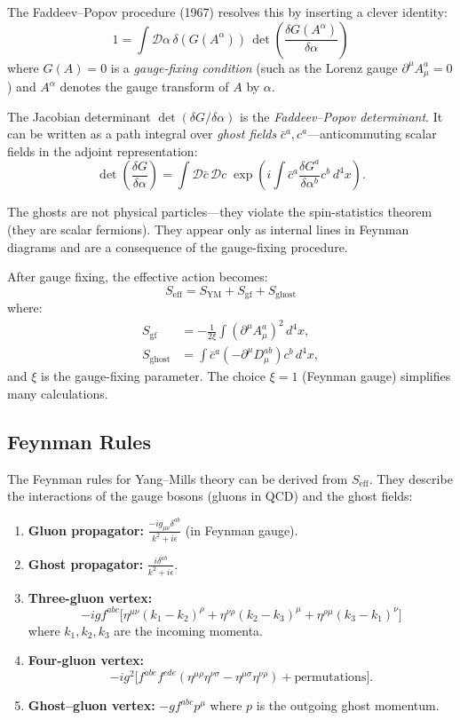 The Faddeev--Popov procedure (1967) resolves this by inserting a clever identity:
\[
1 = \int \mathcal{D}\alpha \, \delta(G(A^\alpha)) \, \det\left(\frac{\delta G(A^\alpha)}{\delta \alpha}\right)
\]
where $G(A) = 0$ is a \textit{gauge-fixing condition} (such as the Lorenz gauge $\partial^\mu A_\mu^a = 0$) and $A^\alpha$ denotes the gauge transform of $A$ by $\alpha$.

The Jacobian determinant $\det(\delta G/\delta \alpha)$ is the \textit{Faddeev--Popov determinant}. It can be written as a path integral over \textit{ghost fields} $\bar{c}^a, c^a$---anticommuting scalar fields in the adjoint representation:
\[
\det\left(\frac{\delta G}{\delta \alpha}\right) = \int \mathcal{D}\bar{c}\,\mathcal{D}c \; \exp\left(i\int \bar{c}^a \frac{\delta G^a}{\delta \alpha^b} c^b \, d^4x\right).
\]

The ghosts are not physical particles---they violate the spin-statistics theorem (they are scalar fermions). They appear only as internal lines in Feynman diagrams and are a consequence of the gauge-fixing procedure.

After gauge fixing, the effective action becomes:
\[
S_{\mathrm{eff}} = S_{\mathrm{YM}} + S_{\mathrm{gf}} + S_{\mathrm{ghost}}
\]
where:
\begin{align}
S_{\mathrm{gf}} &= -\frac{1}{2\xi} \int (\partial^\mu A_\mu^a)^2 \, d^4x, \\
S_{\mathrm{ghost}} &= \int \bar{c}^a \left(-\partial^\mu D_\mu^{ab}\right) c^b \, d^4x,
\end{align}
and $\xi$ is the gauge-fixing parameter. The choice $\xi = 1$ (Feynman gauge) simplifies many calculations.

\subsection{Feynman Rules}

The Feynman rules for Yang--Mills theory can be derived from $S_{\mathrm{eff}}$. They describe the interactions of the gauge bosons (gluons in QCD) and the ghost fields:

\begin{enumerate}
  \item \textbf{Gluon propagator:} $\displaystyle\frac{-ig_{\mu\nu}\delta^{ab}}{k^2 + i\epsilon}$ (in Feynman gauge).

  \item \textbf{Ghost propagator:} $\displaystyle\frac{i\delta^{ab}}{k^2 + i\epsilon}$.

  \item \textbf{Three-gluon vertex:}
  \[
  -ig f^{abc}\bigl[\eta^{\mu\nu}(k_1 - k_2)^\rho + \eta^{\nu\rho}(k_2 - k_3)^\mu + \eta^{\rho\mu}(k_3 - k_1)^\nu\bigr]
  \]
  where $k_1, k_2, k_3$ are the incoming momenta.

  \item \textbf{Four-gluon vertex:}
  \[
  -ig^2\bigl[f^{abe}f^{cde}(\eta^{\mu\rho}\eta^{\nu\sigma} - \eta^{\mu\sigma}\eta^{\nu\rho}) + \text{permutations}\bigr].
  \]

  \item \textbf{Ghost--gluon vertex:} $-gf^{abc}p^\mu$ where $p$ is the outgoing ghost momentum.
\end{enumerate}

